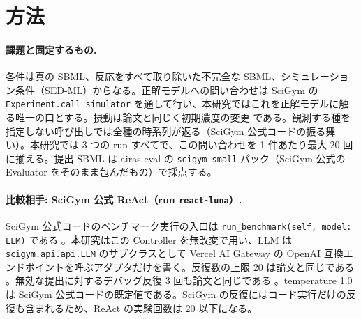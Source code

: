 \documentclass{article}
\begin{document}
\section{方法}
\label{sec:method}
\paragraph{課題と固定するもの.}
各件は真の SBML、反応をすべて取り除いた不完全な SBML、シミュレーション条件（SED-ML）からなる。正解モデルへの問い合わせは SciGym の \texttt{Experiment.call\_simulator} \cite[s1.p12]{duan-2025-measuring} を通して行い、本研究ではこれを正解モデルに触る唯一の口とする。摂動は論文と同じく初期濃度の変更 \cite[s1.p4]{duan-2025-measuring} である。観測する種を指定しない呼び出しでは全種の時系列が返る（SciGym 公式コードの振る舞い）。本研究では 3 つの run すべてで、この問い合わせを 1 件あたり最大 20 回に揃える。提出 SBML は airas-eval の \texttt{scigym\_small} パック（SciGym 公式の Evaluator をそのまま包んだもの）で採点する。

\paragraph{比較相手: SciGym 公式 ReAct（run \texttt{react-luna}）.}
SciGym 公式コードのベンチマーク実行の入口は \texttt{run\_benchmark(self, model: LLM)} である \cite[s1.p11]{duan-2025-measuring}。本研究はこの Controller を無改変で用い、LLM は \texttt{scigym.api.api.LLM} のサブクラスとして Vercel AI Gateway の OpenAI 互換エンドポイントを呼ぶアダプタだけを書く。反復数の上限 20 は論文と同じである \cite[s1.p1]{duan-2025-measuring}。無効な提出に対するデバッグ反復 3 回も論文と同じである \cite[s1.p2]{duan-2025-measuring}。temperature 1.0 は SciGym 公式コードの既定値である。SciGym の反復にはコード実行だけの反復も含まれるため、ReAct の実験回数は 20 以下になる。
\end{document}
